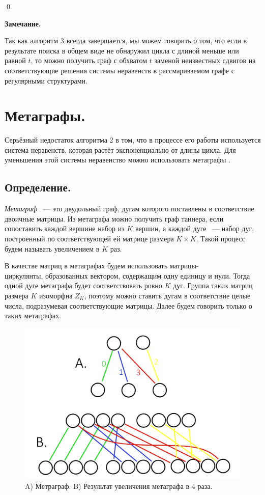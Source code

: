 \documentclass[14pt]{mmcs-article}
\begin{document}
\qed

\textbf{Замечание.}

Так как алгоритм 3 всегда завершается, мы можем говорить о том, что если в результате поиска в общем виде не обнаружил цикла с длиной меньше или равной $t$, то можно получить граф с обхватом $t$ заменой неизвестных сдвигов на соответствующие решения системы неравенств в рассмариваемом графе с регулярными структурами.

\newpage
\section{Метаграфы.}

Серьёзный недостаток алгоритма 2 в том, что в процессе его работы используется система неравенств, которая растёт экспоненциально от длины цикла. Для уменьшения этой системы неравенство можно использовать метаграфы \cite{metagraphs}.

\subsection{Определение.}

\textsl{Метаграф} ~--- это двудольный граф, дугам которого поставлены в соответствие двоичные матрицы. Из метаграфа можно получить граф таннера, если сопоставить каждой вершине набор из $K$ вершин, а каждой дуге ~--- набор дуг, построенный по соответствующей ей матрице размера $K \times K$. Такой процесс будем называть увеличением в $K$ раз. 

В качестве матриц в метаграфах будем использовать матрицы-\\циркулянты, образованных вектором, содержащим одну единицу и нули. Тогда одной дуге метаграфа будет соответствовать ровно $K$ дуг. Группа таких матриц размера $K$ изоморфна $Z_K$, поэтому можно ставить дугам в соответствие целые числа, подразумевая соответствующие матрицы. Далее будем говорить только о таких метаграфах.

\begin{figure}[H]
  \centering
  \includegraphics[scale=0.35]{Fig_8.png}
  \caption{ A) Метраграф. B) Результат увеличения метаграфа в 4 раза. }
  \label{metagraph:1}
\end{figure}
\end{document}

